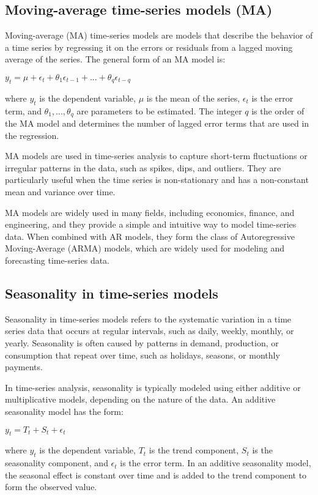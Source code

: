 \documentclass[12pt, a4paper, oneside]{article}
\begin{document}
\subsection{ Moving-average time-series models (MA) }
Moving-average (MA) time-series models are models that describe the behavior of a time series by regressing it on the errors or residuals from a lagged moving average of the series. The general form of an MA model is:

$y_t = \mu + \epsilon_t + \theta_1 \epsilon_{t-1} + ... + \theta_q \epsilon_{t-q}$

where $y_t$ is the dependent variable, $\mu$ is the mean of the series, $\epsilon_t$ is the error term, and $\theta_1, ..., \theta_q$ are parameters to be estimated. The integer $q$ is the order of the MA model and determines the number of lagged error terms that are used in the regression.

MA models are used in time-series analysis to capture short-term fluctuations or irregular patterns in the data, such as spikes, dips, and outliers. They are particularly useful when the time series is non-stationary and has a non-constant mean and variance over time.

MA models are widely used in many fields, including economics, finance, and engineering, and they provide a simple and intuitive way to model time-series data. When combined with AR models, they form the class of Autoregressive Moving-Average (ARMA) models, which are widely used for modeling and forecasting time-series data.
\subsection{ Seasonality in time-series models }
Seasonality in time-series models refers to the systematic variation in a time series data that occurs at regular intervals, such as daily, weekly, monthly, or yearly. Seasonality is often caused by patterns in demand, production, or consumption that repeat over time, such as holidays, seasons, or monthly payments.

In time-series analysis, seasonality is typically modeled using either additive or multiplicative models, depending on the nature of the data. An additive seasonality model has the form:

$y_t = T_t + S_t + \epsilon_t$

where $y_t$ is the dependent variable, $T_t$ is the trend component, $S_t$ is the seasonality component, and $\epsilon_t$ is the error term. In an additive seasonality model, the seasonal effect is constant over time and is added to the trend component to form the observed value.
\end{document}

